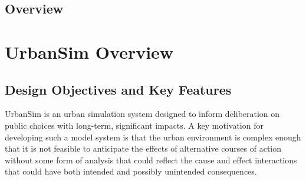 \subsection{Overview}
\section{UrbanSim Overview}

\subsection{Design Objectives and Key Features}

UrbanSim is an urban simulation system designed to inform deliberation on public choices with
long-term, significant impacts.  A key motivation 
for developing such a model system is that the urban environment
is complex enough that it is not feasible to anticipate the effects
of alternative courses of action without some form of analysis that
could reflect the cause and effect interactions that could have both intended and possibly unintended consequences.

